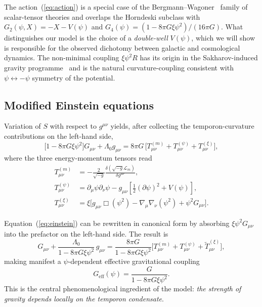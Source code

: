 \documentclass[%
    aps,
    prd,
    reprint,
    superscriptaddress,
    nofootinbib,
    floatfix,
    amsmath,amssymb,
]{revtex4-2}
\newcommand{\Geff}{G_{\mathrm{eff}}}
\begin{document}
The action~(\ref{eq:action}) is a special case of the
Bergmann--Wagoner~\cite{Bergmann1968,Wagoner1970} family of
scalar-tensor theories and overlaps the Horndeski subclass with
$G_{2}(\psi,X) = -X - V(\psi)$ and $G_{4}(\psi) = (1-8\pi G\xi\psi^{2})/(16\pi G)$.
What distinguishes our model is the choice of a \emph{double-well} $V(\psi)$,
which we will show is responsible for the observed dichotomy between
galactic and cosmological dynamics. The non-minimal coupling
$\xi\psi^{2}R$ has its origin in the Sakharov-induced
gravity programme~\cite{Sakharov1968,Zee1979} and is the
natural curvature-coupling consistent with $\psi \leftrightarrow -\psi$
symmetry of the potential.

\subsection{Modified Einstein equations}

Variation of $S$ with respect to $g^{\mu\nu}$ yields, after
collecting the temporon-curvature contributions on the left-hand side,
\begin{equation}
\label{eq:einstein}
\bigl[1 - 8\pi G\xi\psi^{2}\bigr] G_{\mu\nu} + \Lambda_{0} g_{\mu\nu}
    = 8\pi G\,\bigl[T^{(m)}_{\mu\nu} + T^{(\psi)}_{\mu\nu} + T^{(\xi)}_{\mu\nu}\bigr],
\end{equation}
where the three energy-momentum tensors read
\begin{align}
T^{(m)}_{\mu\nu} &= -\frac{2}{\sqrt{-g}}\frac{\delta(\sqrt{-g}\mathcal{L}_{m})}{\delta g^{\mu\nu}}, \\
T^{(\psi)}_{\mu\nu} &= \partial_{\mu}\psi\partial_{\nu}\psi
                       - g_{\mu\nu}\!\left[\tfrac{1}{2}(\partial\psi)^{2} + V(\psi)\right], \\
T^{(\xi)}_{\mu\nu} &= \xi\bigl[g_{\mu\nu}\Box(\psi^{2})
                       - \nabla_{\mu}\nabla_{\nu}(\psi^{2}) + \psi^{2}G_{\mu\nu}\bigr].
\end{align}

Equation~(\ref{eq:einstein}) can be rewritten in canonical form by
absorbing $\xi\psi^{2}G_{\mu\nu}$ into the prefactor on the
left-hand side. The result is
\begin{equation}
\label{eq:Geff_def}
G_{\mu\nu} + \frac{\Lambda_{0}}{1-8\pi G\xi\psi^{2}}\,g_{\mu\nu}
    = \frac{8\pi G}{1-8\pi G\xi\psi^{2}}
       \bigl[T^{(m)}_{\mu\nu} + T^{(\psi)}_{\mu\nu} + \tilde{T}^{(\xi)}_{\mu\nu}\bigr],
\end{equation}
making manifest a $\psi$-dependent effective gravitational
coupling
\begin{equation}
\label{eq:Geff}
\Geff(\psi) = \frac{G}{1 - 8\pi G\xi\psi^{2}}.
\end{equation}
This is the central phenomenological ingredient of the model:
\emph{the strength of gravity depends locally on the temporon condensate}.
\end{document}

